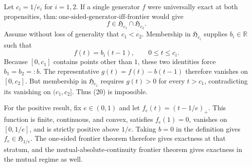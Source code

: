 Let \(c_i=1/e_i\) for \(i=1,2\).  If a single generator \(f\) were universally exact at both propensities, \(\mathrm{thm:one\text{-}sided\text{-}generator\text{-}iff\text{-}frontier}\) would give
\[
 f\in\mathfrak H_{c_1}\cap\mathfrak H_{c_2}. \tag{20}
\]
Assume without loss of generality that \(c_1<c_2\).  Membership in \(\mathfrak H_{c_i}\) supplies \(b_i\in\mathbb R\) such that
\[
 f(t)=b_i(t-1),\qquad 0\le t\le c_i.
\]
Because \([0,c_1]\) contains points other than \(1\), these two identities force \(b_1=b_2=:b\).  The representative \(g(t)=f(t)-b(t-1)\) therefore vanishes on \([0,c_2]\).  But membership in \(\mathfrak H_{c_1}\) requires \(g(t)>0\) for every \(t>c_1\), contradicting its vanishing on \((c_1,c_2]\).  Thus (20) is impossible.

For the positive result, fix \(e\in(0,1)\) and let \(f_e(t)=(t-1/e)_+\).  This function is finite, continuous, and convex, satisfies \(f_e(1)=0\), vanishes on \([0,1/e]\), and is strictly positive above \(1/e\).  Taking \(b=0\) in the definition gives \(f_e\in\mathfrak H_{1/e}\).  The one-sided frontier theorem therefore gives exactness at that stratum, and the mutual-absolute-continuity frontier theorem gives exactness in the mutual regime as well.